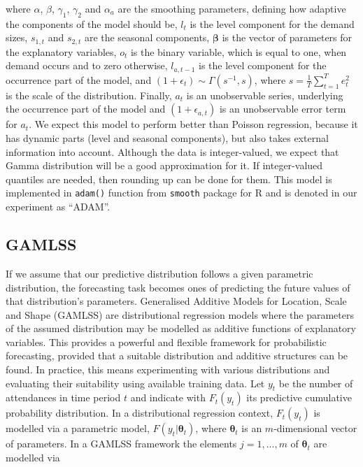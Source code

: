 \documentclass[]{elsarticle} %
\begin{document}
where \(\alpha\), \(\beta\), \(\gamma_1\), \(\gamma_2\) and \(\alpha_a\) are the smoothing parameters, defining how adaptive the components of the model should be, \(l_t\) is the level component for the demand sizes, \(s_{1,t}\) and \(s_{2,t}\) are the seasonal components, \(\boldsymbol{\beta}\) is the vector of parameters for the explanatory variables, \(o_t\) is the binary variable, which is equal to one, when demand occurs and to zero otherwise, \(l_{a,t-1}\) is the level component for the occurrence part of the model, and \(\left(1+\epsilon_t \right) \sim \mathcal{\Gamma}(s^{-1}, s)\), where \(s=\frac{1}{T} \sum_{t=1}^{T} e_{t}^2\) is the scale of the distribution. Finally, \(a_t\) is an unobservable series, underlying the occurrence part of the model and \((1 + \epsilon_{a,t})\) is an unobservable error term for \(a_t\). We expect this model to perform better than Poisson regression, because it has dynamic parts (level and seasonal components), but also takes external information into account. Although the data is integer-valued, we expect that Gamma distribution will be a good approximation for it. If integer-valued quantiles are needed, then rounding up can be done for them. This model is implemented in \texttt{adam()} function from \texttt{smooth} package \citep{Svetunkov2021Smooth} for R and is denoted in our experiment as ``ADAM''.

\hypertarget{gamlss}{%
\subsection{GAMLSS}\label{gamlss}}

If we assume that our predictive distribution follows a given parametric distribution, the forecasting task becomes ones of predicting the future values of that distribution's parameters. Generalised Additive Models for Location, Scale and Shape (GAMLSS) are distributional regression models where the parameters of the assumed distribution may be modelled as additive functions of explanatory variables. This provides a powerful and flexible framework for probabilistic forecasting, provided that a suitable distribution and additive structures can be found. In practice, this means experimenting with various distributions and evaluating their suitability using available training data.
Let \(y_t\) be the number of attendances in time period \(t\) and indicate with \(F_t(y_t)\) its predictive cumulative probability distribution. In a distributional regression context, \(F_t(y_t)\) is modelled via a parametric model, \(F(y_t|\bm \theta_t)\), where \(\bm \theta_t\) is an \(m\)-dimensional vector of parameters. In a GAMLSS framework \citet{Rigby2005} the elements \(j=1,...,m\) of \(\bm \theta_t\) are modelled via
\end{document}
